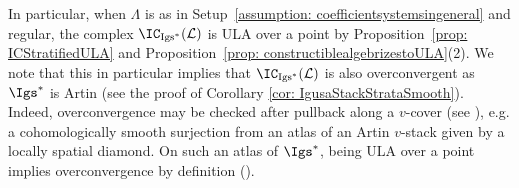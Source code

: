 \documentclass[letterpaper,11pt]{amsart}
\begin{document}
In particular, when $\Lambda$ is as in Setup~\ref{assumption: coefficientsystemsingeneral} and regular, the complex $\IC_{\mathrm{Igs}^\ast}(\mathcal{L})$ is ULA over a point by Proposition~\ref{prop: ICStratifiedULA} and Proposition~\ref{prop: constructiblealgebrizestoULA}(2). We note that this in particular implies that $\IC_{\mathrm{Igs}^{*}}(\mathcal{L})$ is also overconvergent as $\Igs^\ast$ is Artin (see the proof of Corollary \ref{cor: IgusaStackStrataSmooth}). Indeed, overconvergence may be checked after pullback along a $v$-cover (see \cite[Proposition~4.4.5 (1)]{GHILZIsocComparison}), e.g. a cohomologically smooth surjection from an atlas of an Artin $v$-stack given by a locally spatial diamond. On such an atlas of $\Igs^\ast$, being ULA over a point implies overconvergence by definition (\cite[Remark~IV.2.2]{FSGeomLLC}). 
\end{document}
